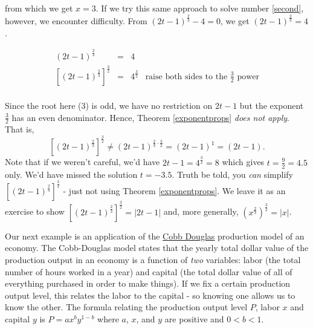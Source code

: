 from which we get $x = 3$.  If we try this same approach to solve number \ref{second}, however, we encounter difficulty.  From $(2t-1)^{\frac{2}{3}} -4 = 0$, we get $(2t-1)^{\frac{2}{3}}  =4$.  

\[ \begin{array}{rclr}  

(2t-1)^{\frac{2}{3}} & = & 4 & \\

 \left[(2t-1)^{\frac{2}{3}}  \right]^{\frac{3}{2}} & = & 4^{\frac{3}{2}}& \text{raise both sides to the $\frac{3}{2}$ power} \\ \end{array} \]
 
 Since the root here ($3$) is odd, we have no restriction on $2t-1$ but the exponent $\frac{3}{2}$ has an even denominator.  Hence, Theorem \ref{exponentprops} \textit{does not apply}.  That is, \[\left[(2t-1)^{\frac{2}{3}}  \right]^{\frac{3}{2}} \neq (2t-1)^{\frac{2}{3} \cdot \frac{3}{2}} = (2t-1)^{1} = (2t-1).\]
 Note that if we weren't careful, we'd have $2t-1 = 4^{\frac{3}{2}} = 8$ which gives $t= \frac{9}{2} = 4.5$ only.   We'd have missed the solution $t = -3.5$.  Truth be told, you \textit{can} simplify $\left[(2t-1)^{\frac{2}{3}}  \right]^{\frac{3}{2}} $ - just not using Theorem \ref{exponentprops}.  We leave it as an exercise to show  $\left[(2t-1)^{\frac{2}{3}}  \right]^{\frac{3}{2}} = |2t-1|$ and, more generally, $\left(x^{\frac{2}{3}}\right)^{\frac{3}{2}} = |x|$.
 
 Our next example is an application of the  \href{https://en.wikipedia.org/wiki/Cobb-Douglas_production_function}{\underline{Cobb Douglas}} production model of an economy.  The Cobb-Douglas model states that the yearly total dollar value of the production output in an economy is a function of \textit{two} variables:   labor (the total number of hours worked in a year) and capital (the total dollar value of all of everything purchased in order to make things).  If we fix a certain production output level, this relates the labor to the capital - so knowing one allows us to know the other.   The formula relating the production output level $P$, labor $x$ and capital $y$ is $P = a x^{b} y^{1-b}$ where $a$, $x$, and $y$ are positive and $0 < b < 1$.    

